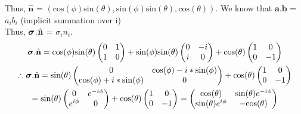     Thus, $\hat{\mathbf{n}}$ = $(\textrm{cos}(\phi)\textrm{sin}(\theta), \textrm{sin}(\phi)\textrm{sin}(\theta), \textrm{cos}(\theta))$. We know that $\mathbf{a}.\mathbf{b}$ = $a_{i}b_{i}$ (implicit summation over i)\\
    Thus, $\boldsymbol{\sigma}$.$\hat{\textbf{n}}$ = $\sigma_{i}n_{i}$.
    \begin{gather*}
        \boldsymbol{\sigma}.\hat{\textbf{n}} = \textrm{cos}(\phi)\textrm{sin}(\theta)
        \begin{pmatrix}
            0 & 1 \\
            1 & 0
        \end{pmatrix} + \textrm{sin}(\phi)\textrm{sin}(\theta)
        \begin{pmatrix}
            0 & -i \\
            i & 0
        \end{pmatrix} + \textrm{cos}(\theta)
        \begin{pmatrix}
            1 & 0 \\
            0 & -1
        \end{pmatrix} \\
        \therefore \boldsymbol{\sigma}.\hat{\textbf{n}} = \textrm{sin}(\theta)
        \begin{pmatrix}
            0 & \textrm{cos}(\phi) - i*\textrm{sin}(\phi) \\
            \textrm{cos}(\phi) + i*\textrm{sin}(\phi) & 0
        \end{pmatrix} + \textrm{cos}(\theta)
        \begin{pmatrix}
            1 & 0 \\
            0 & -1
        \end{pmatrix} \\
        = \textrm{sin}(\theta)
        \begin{pmatrix}
            0 & e^{-i\phi} \\
            e^{i\phi} & 0
        \end{pmatrix} + \textrm{cos}(\theta)
        \begin{pmatrix}
            1 & 0 \\
            0 & -1
        \end{pmatrix} = 
        \begin{pmatrix}
            \textrm{cos}(\theta) & \textrm{sin}(\theta)e^{-i\phi} \\
            \textrm{sin}(\theta)e^{i\phi} & -\textrm{cos}(\theta)
        \end{pmatrix}
    \end{gather*}

